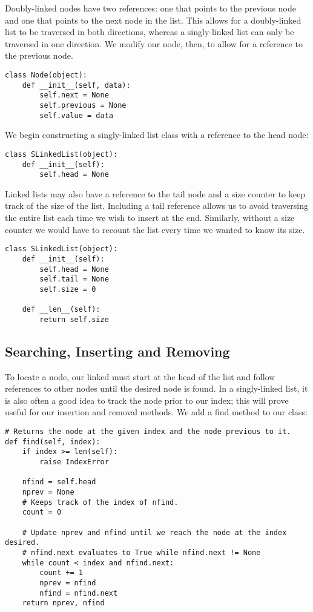 Doubly-linked nodes have two references: one that points to the previous node and one that points to the next node in the list.
This allows for a doubly-linked list to be traversed in both directions, whereas a singly-linked list can only be traversed in one direction.
We modify our node, then, to allow for a reference to the previous node.
\begin{lstlisting}
class Node(object):
    def __init__(self, data):
        self.next = None
        self.previous = None
        self.value = data
\end{lstlisting}

We begin constructing a singly-linked list class with a reference to the head node:
\begin{lstlisting}
class SLinkedList(object):
    def __init__(self):
        self.head = None
\end{lstlisting}

Linked lists may also have a reference to the tail node and a size counter to keep track of the size of the list.
Including a tail reference allows us to avoid traversing the entire list each time we wish to insert at the end.
Similarly, without a size counter we would have to recount the list every time we wanted to know its size.
\begin{lstlisting}
class SLinkedList(object):
    def __init__(self):
        self.head = None
        self.tail = None
        self.size = 0
    
    def __len__(self):
        return self.size
\end{lstlisting}

\subsection*{Searching, Inserting and Removing}
To locate a node, our linked must start at the head of the list and follow references to other nodes until the desired node is found.
In a singly-linked list, it is also often a good idea to track the node prior to our index; this will prove useful for our insertion and removal methods. 
We add a find method to our  class:
\begin{lstlisting}
# Returns the node at the given index and the node previous to it.
def find(self, index):
    if index >= len(self):
        raise IndexError

    nfind = self.head
    nprev = None
    # Keeps track of the index of nfind.
    count = 0

    # Update nprev and nfind until we reach the node at the index desired.
    # nfind.next evaluates to True while nfind.next != None
    while count < index and nfind.next:
        count += 1
        nprev = nfind
        nfind = nfind.next
    return nprev, nfind
\end{lstlisting}

